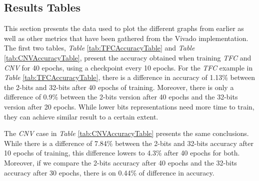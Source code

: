 \newpage
\subsection{Results Tables}

This section presents the data used to plot the different graphs from earlier as well as other metrics that have been gathered from the Vivado implementation. The first two tables, \emph{Table} \ref{tab:TFCAccuracyTable} and \emph{Table} \ref{tab:CNVAccuracyTable}, present the accuracy obtained when training \emph{TFC} and \emph{CNV} for 40 epochs, using a checkpoint every 10 epochs. For the \emph{TFC} example in \emph{Table} \ref{tab:TFCAccuracyTable}, there is a difference in accuracy of 1.13\% between the 2-bits and 32-bits after 40 epochs of training. Moreover, there is only a difference of 0.9\% between the 2-bits version after 40 epochs and the 32-bits version after 20 epochs. While lower bits representations need more time to train, they can achieve similar result to a certain extent.

\begin{table}[!htb]
  \centering
\caption[TFC Accuracy Table]{TFC accuracy for different training times}
\label{tab:TFCAccuracyTable}
\end{table}

The \emph{CNV} case in \emph{Table} \ref{tab:CNVAccuracyTable} presents the same conclusions. While there is a difference of 7.84\% between the 2-bits and 32-bits accuracy after 10 epochs of training, this difference lowers to 4.3\% after 40 epochs for both. Moreover, if we compare the 2-bits accuracy after 40 epochs and the 32-bits accuracy after 30 epochs, there is on 0.44\% of difference in accuracy.

